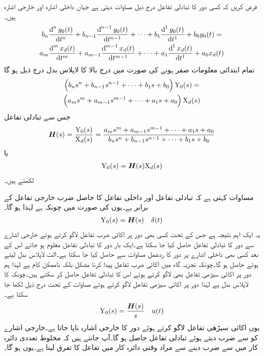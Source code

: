فرض کریں کہ کسی دور کا تبادلی تفاعل درج ذیل مساوات دیتی ہے جہاں  داخلی اشارہ اور  خارجی اشارہ ہیں۔
\begin{multline*}
b_n\frac{\dif^{\, n} y_0(t)}{\dif t^{n}}+b_{n-1}\frac{\dif^{\, n-1} y_0(t)}{\dif t^{n-1}}+\cdots+b_{1}\frac{\dif^{\, 1} y_0(t)}{\dif t^{1}}+b_0 y_0(t)=\\
a_m\frac{\dif^{\, m} x_d(t)}{\dif t^{m}}+a_{m-1}\frac{\dif^{\, m-1} x_d(t)}{\dif t^{m-1}}+\cdots+a_{1}\frac{\dif^{\, 1} x_d(t)}{\dif t^{1}}+a_0 x_d(t)
\end{multline*}
تمام ابتدائی معلومات صفر ہونے کی صورت میں درج بالا کا لاپلاس بدل درج ذیل ہو گا
\begin{multline*}
\left(b_n s^n+b_{n-1}s^{n-1}+\cdots +b_1 s+b_0\right){\textup{Y}_0(s)}=\\
\left(a_m s^m+a_{m-1}s^{m-1}+\cdots+a_1 s+a_0\right){\textup{X}_d(s)}
\end{multline*}
جس سے تبادلی تفاعل  
\begin{align*}
{\ensuremath{{\boldsymbol{H}}}}(s)=\frac{{\textup{Y}_0(s)}}{{\textup{X}_d(s)}}=\frac{a_m s^m+a_{m-1}s^{m-1}+\cdots+a_1 s+a_0}{b_n s^n+b_{n-1}s^{n-1}+\cdots +b_1 s+b_0}
\end{align*}
یا
\begin{align}\label{مساوات_لاپلاس_استعمال_عمومی_الف}
{\textup{Y}_0(s)}={{\boldsymbol{H}}}(s){\textup{X}_d(s)}
\end{align}
لکھتے ہیں۔

مساوات  کہتی ہے کہ تبادلی تفاعل  اور داخلی تفاعل  کا حاصل ضرب خارجی تفاعل  کے برابر ہے۔یوں  کی صورت میں چونکہ  ہے لہٰذا  ہو گا۔
\begin{align}\label{مساوات_لاپلاس_استعمال_تبادلی_تفاعل_اور_خارجی_اشارہ}
{\textup{Y}_0(s)}={{\boldsymbol{H}}}(s)\quad  \delta(t)
\end{align}
یہ ایک اہم نتیجہ ہے جس کے تحت کسی بھی دور پر اکائی ضرب تفاعل لاگو کرتے ہوئے خارجی اشارے سے دور کا تبادلی تفاعل حاصل کیا جا سکتا ہے۔ایک بار دور کا تبادلی تفاعل معلوم ہو جائے اس کے بعد کسی بھی داخلی اشارے پر دور کا ردعمل مساوات  سے حاصل کیا جا سکتا ہے۔الٹ لاپلاس بدل لیتے ہوئے  حاصل ہو گا۔چونکہ تجزیہ گاہ میں اکائی ضرب تفاعل پیدا کرنا مشکل بلکہ ناممکن کام ہے لہٰذا ہم دور پر اکائی سیڑھی تفاعل بھی لاگو کرتے ہوئے اس کا تبادلی تفاعل حاصل کر سکتے ہیں۔چونکہ  کا لاپلاس بدل  ہے لہٰذا دور پر اکائی سیڑھی تفاعل لاگو کرتے ہوئے مساوات  کے تحت درج ذیل لکھا جا سکتا ہے۔
\begin{align}
{\textup{Y}_0(s)}=\frac{{{\boldsymbol{H}}}(s)}{s} \quad u(t)
\end{align}
یوں اکائی سیڑھی تفاعل لاگو کرتے ہوئے دور کا خارجی اشارہ ناپا جاتا ہے۔خارجی اشارے کو  سے  ضرب دیتے ہوئے تبادلی  تفاعل حاصل ہو گا۔آپ جانتے ہیں کہ مخلوط تعددی دائرہ کار میں  سے ضرب دینے سے مراد وقتی دائرہ کار میں تفاعل کا تفرق لینا ہے۔یوں   ہو گا۔

